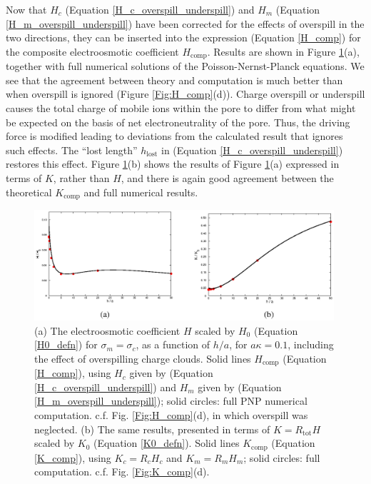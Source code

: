 Now that $H_c$ (Equation \ref{H_c_overspill_underspill}) and 
$H_m$ (Equation \ref{H_m_overspill_underspill})
have been corrected for the effects of overspill
in the two directions, they can be inserted into the expression
(Equation \ref{H_comp})
for the composite electroosmotic coefficient $H_\text{comp}$.
Results are shown in Figure \ref{Fig:H_comp_akappa_small}(a), together
with full numerical solutions of the Poisson-Nernst-Planck equations.
We see that the agreement between theory and computation is much better
than  when overspill is ignored (Figure \ref{Fig:H_comp}(d)). 
Charge overspill or underspill causes the total charge of mobile ions
within the pore to differ
from what might be expected on the basis of net 
electroneutrality of the pore. 
Thus, the driving force is modified leading to deviations from the calculated 
result that ignores such effects. The ``lost length'' $h_\text{lost}$ in (Equation \ref{H_c_overspill_underspill})
restores this effect.
Figure \ref{Fig:H_comp_akappa_small}(b) shows the results of
Figure \ref{Fig:H_comp_akappa_small}(a) expressed in terms of
$K$, rather than $H$, and there is again good agreement between the
theoretical $K_\text{comp}$ and full numerical results.

\begin{figure}[h]
\begin{center}
\includegraphics[width=0.99\textwidth]{finite_thickness/finite_pore_pic8.eps}
\caption{\label{Fig:H_comp_akappa_small}
(a) The electroosmotic coefficient $H$ scaled by $H_0$ (Equation \ref{H0_defn}) for $\sigma_m=\sigma_c$, as a function of $h/a$, for $a\kappa=0.1$, including the effect of overspilling charge clouds. Solid lines $H_\text{comp}$ (Equation \ref{H_comp}), using $H_c$ given by (Equation \ref{H_c_overspill_underspill}) and $H_m$ given by (Equation \ref{H_m_overspill_underspill}); solid circles: full PNP numerical computation. c.f. Fig. \ref{Fig:H_comp}(d), in which overspill was neglected. (b) The same results, presented in terms of $K=R_\text{tot}H$ scaled by $K_0$ (Equation \ref{K0_defn}). Solid lines $K_\text{comp}$ (Equation \ref{K_comp}), using $K_c=R_cH_c$ and $K_m=R_mH_m$; solid circles: full computation. c.f. Fig. \ref{Fig:K_comp}(d).}
\end{center}
\end{figure}

